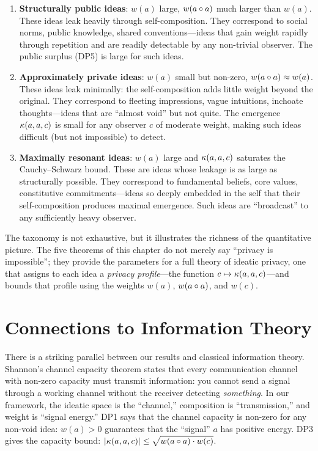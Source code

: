 \begin{enumerate}
\item \textbf{Structurally public ideas}: $w(a)$ large, $w(a \circ a)$
much larger than $w(a)$. These ideas leak heavily through
self-composition. They correspond to social norms, public knowledge,
shared conventions---ideas that gain weight rapidly through repetition
and are readily detectable by any non-trivial observer. The public
surplus (DP5) is large for such ideas.

\item \textbf{Approximately private ideas}: $w(a)$ small but non-zero,
$w(a \circ a) \approx w(a)$. These ideas leak minimally: the
self-composition adds little weight beyond the original. They
correspond to fleeting impressions, vague intuitions, inchoate
thoughts---ideas that are ``almost void'' but not quite. The emergence
$\kappa(a, a, c)$ is small for any observer $c$ of moderate weight,
making such ideas difficult (but not impossible) to detect.

\item \textbf{Maximally resonant ideas}: $w(a)$ large and
$\kappa(a, a, c)$ saturates the Cauchy--Schwarz bound. These are ideas
whose leakage is as large as structurally possible. They correspond to
fundamental beliefs, core values, constitutive commitments---ideas so
deeply embedded in the self that their self-composition produces maximal
emergence. Such ideas are ``broadcast'' to any sufficiently heavy
observer.
\end{enumerate}

The taxonomy is not exhaustive, but it illustrates the richness of the
quantitative picture. The five theorems of this chapter do not merely
say ``privacy is impossible''; they provide the parameters for a
full theory of ideatic privacy, one that assigns to each idea a
\emph{privacy profile}---the function $c \mapsto \kappa(a, a, c)$---and
bounds that profile using the weights $w(a)$, $w(a \circ a)$, and
$w(c)$.

\section{Connections to Information Theory}

There is a striking parallel between our results and classical
information theory. Shannon's channel capacity theorem states that
every communication channel with non-zero capacity must transmit
information: you cannot send a signal through a working channel without
the receiver detecting \emph{something}. In our framework, the ideatic
space is the ``channel,'' composition is ``transmission,'' and weight is
``signal energy.'' DP1 says that the channel capacity is non-zero for
any non-void idea: $w(a) > 0$ guarantees that the ``signal'' $a$ has
positive energy. DP3 gives the capacity bound: $|\kappa(a, a, c)| \leq
\sqrt{w(a \circ a) \cdot w(c)}$.

